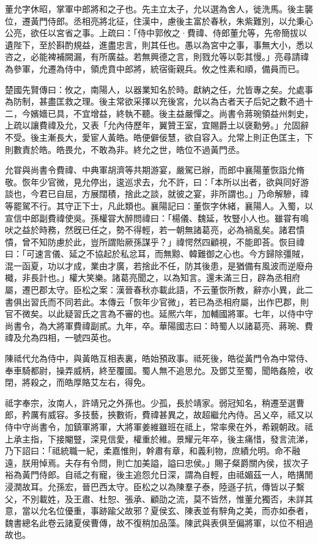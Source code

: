 
\begin{pinyinscope}
董允字休昭，掌軍中郎將和之子也。先主立太子，允以選為舍人，徙洗馬。後主襲位，遷黃門侍郎。丞相亮將北征，住漢中，慮後主富於春秋，朱紫難別，以允秉心公亮，欲任以宮省之事。上疏曰：「侍中郭攸之·費禕、侍郎董允等，先帝簡拔以遺陛下，至於斟酌規益，進盡忠言，則其任也。愚以為宮中之事，事無大小，悉以咨之，必能裨補闕漏，有所廣益。若無興德之言，則戮允等以彰其慢。」亮尋請禕為參軍，允遷為侍中，領虎賁中郎將，統宿衞親兵。攸之性素和順，備員而已。

楚國先賢傳曰：攸之，南陽人，以器業知名於時。獻納之任，允皆專之矣。允處事為防制，甚盡匡救之理。後主常欲采擇以充後宮，允以為古者天子后妃之數不過十二，今嬪嬙已具，不宜增益，終執不聽。後主益嚴憚之。尚書令蔣琬領益州刺史，上疏以讓費禕及允，又表「允內侍歷年，翼贊王室，宜賜爵土以襃勳勞。」允固辭不受。後主漸長大，愛宦人黃皓。皓便僻佞慧，欲自容入。允常上則正色匡主，下則數責於皓。皓畏允，不敢為非。終允之世，皓位不過黃門丞。

允甞與尚書令費禕、中典軍胡濟等共期游宴，嚴駕已辦，而郎中襄陽董恢詣允脩敬。恢年少官微，見允停出，逡巡求去，允不許，曰：「本所以出者，欲與同好游談也，今君已自屈，方展闊積，捨此之談，就彼之宴，非所謂也。」乃命解驂，禕等罷駕不行。其守正下士，凡此類也。襄陽記曰：董恢字休緒，襄陽人。入蜀，以宣信中郎副費禕使吳。孫權甞大醉問禕曰：「楊儀、魏延，牧豎小人也。雖甞有鳴吠之益於時務，然旣已任之，勢不得輕，若一朝無諸葛亮，必為禍亂矣。諸君憒憒，曾不知防慮於此，豈所謂貽厥孫謀乎？」禕愕然四顧視，不能即荅。恢目禕曰：「可速言儀、延之不協起於私忿耳，而無黥、韓難御之心也。今方歸除彊賊，混一函夏，功以才成，業由才廣，若捨此不任，防其後患，是猶備有風波而逆廢舟檝，非長計也。」權大笑樂。諸葛亮聞之，以為知言。還未滿三日，辟為丞相府屬，遷巴郡太守。臣松之案：漢晉春秋亦載此語，不云董恢所教，辭亦小異，此二書俱出習氏而不同若此。本傳云「恢年少官微」，若已為丞相府屬，出作巴郡，則官不微矣。以此疑習氏之言為不審的也。延熈六年，加輔國將軍。七年，以侍中守尚書令，為大將軍費禕副貳。九年，卒。華陽國志曰：時蜀人以諸葛亮、蔣琬、費禕及允為四相，一號四英也。

陳祗代允為侍中，與黃皓互相表裏，皓始預政事。祗死後，皓從黃門令為中常侍、奉車騎都尉，操弄威柄，終至覆國。蜀人無不追思允。及鄧艾至蜀，聞皓姦險，收閉，將殺之，而皓厚賂艾左右，得免。

祗字奉宗，汝南人，許靖兄之外孫也。少孤，長於靖家。弱冠知名，稍遷至選曹郎，矜厲有威容。多技藝，挾數術，費禕甚異之，故超繼允內侍。呂乂卒，祗又以侍中守尚書令，加鎮軍將軍，大將軍姜維雖班在祗上，常率衆在外，希親朝政。祗上承主指，下接閹豎，深見信愛，權重於維。景耀元年卒，後主痛惜，發言流涕，乃下詔曰：「祗統職一紀，柔嘉惟則，幹肅有章，和義利物，庶績允明。命不融遠，朕用悼焉。夫存有令問，則亡加美謚，謚曰忠侯。」賜子粲爵關內侯，拔次子裕為黃門侍郎。自祗之有寵，後主追怨允日深，謂為自輕，由祗媚茲一人，皓搆閒浸潤故耳。允孫宏，晉巴西太守。臣松之以為陳羣子泰，陸遜子抗，傳皆以子繫父，不別載姓，及王肅、杜恕、張承、顧劭之流，莫不皆然，惟董允獨否，未詳其意，當以允名位優重，事跡踰父故邪？夏侯玄、陳表並有騂角之美，而亦如泰者，魏書總名此卷云諸夏侯曹傳，故不復稍加品藻。陳武與表俱至偏將軍，以位不相過故也。


\end{pinyinscope}